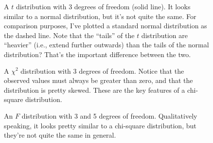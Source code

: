 \begin{figure}
\begin{center}
\caption{A $t$ distribution with 3 degrees of freedom (solid line). It looks similar to a normal distribution, but it's not quite the same. For comparison purposes, I've plotted a standard normal distribution as the dashed line. Note that the ``tails'' of the $t$ distribution are ``heavier'' (i.e., extend further outwards) than the tails of the normal distribution? That's the important difference between the two. }
\label{fig:tdist}
\HR
\end{center}
\end{figure}

\begin{figure}
\begin{center}
\caption{A $\chi^2$ distribution with 3 degrees of freedom. Notice that the observed values must always be greater than zero, and that the distribution is pretty skewed. These are the key features of a chi-square distribution.}
\label{fig:chisqdist}
\HR
\end{center}
\end{figure}

\begin{figure}
\begin{center}
\caption{An $F$ distribution with 3 and 5 degrees of freedom. Qualitatively speaking, it looks pretty similar to a chi-square distribution, but they're not quite the same in general.}
\label{fig:Fdist}
\HR
\end{center}
\end{figure}


